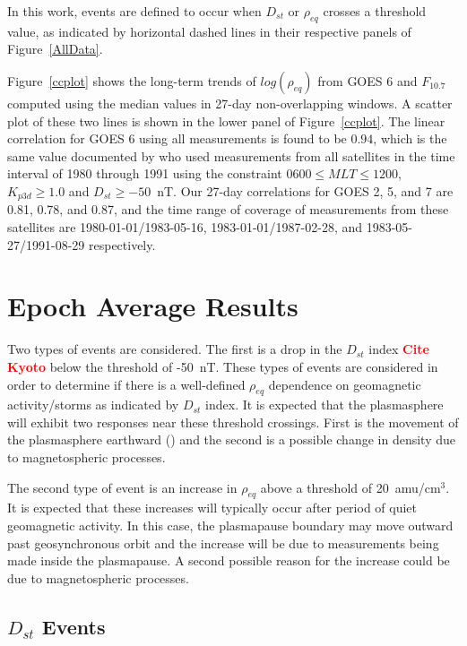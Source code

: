 \documentclass[10pt,twocolumn]{article}
\newcommand{\vinote}[1]{\textcolor{red}{\textbf{#1}}} %
\newcommand{\inote}[1]{\textcolor{blue}{\textbf{#1}}} %
\def\note#1\par{\textcolor{blue}{\textbf{#1}}\\}
\begin{document}
In this work, events are defined to occur when $D_{st}$ or $\rho_{eq}$ crosses a threshold value, as indicated by horizontal dashed lines in their respective panels of Figure~\ref{AllData}.

Figure~\ref{ccplot} shows the long-term trends of $log(\rho_{eq})$ from GOES 6 and $F_{10.7}$ computed using the median values in 27-day non-overlapping windows.  A scatter plot of these two lines is shown in the lower panel of Figure~\ref{ccplot}.  The linear correlation for GOES 6 using all measurements is found to be $0.94$, which is the same value documented by \cite{Takahashi2010} who used measurements from all satellites in the time interval of 1980 through 1991 using the constraint $0600 \leq MLT \le 1200$, $K_{p3d}\ge1.0$ and $D_{st}\ge -50$~nT.  Our 27-day correlations for GOES 2, 5, and 7 are 0.81, 0.78, and 0.87, and the time range of coverage of measurements from these satellites are 1980-01-01/1983-05-16, 1983-01-01/1987-02-28, and 1983-05-27/1991-08-29 respectively.

\section{Epoch Average Results}

Two types of events are considered. The first is a drop in the $D_{st}$ index \vinote{Cite Kyoto} below the threshold of -50~nT. These types of events are considered in order to determine if there is a well-defined $\rho_{eq}$ dependence on geomagnetic activity/storms as indicated by $D_{st}$ index.  It is expected that the plasmasphere will exhibit two responses near these threshold crossings.  First is the movement of the plasmasphere earthward (\cite{LemaireEarthsPlasmasphere}) and the second is a possible change in density due to magnetospheric processes. 

The second type of event is an increase in $\rho_{eq}$ above a threshold of 20~amu/cm$^3$.  It is expected that these increases will typically occur after period of quiet geomagnetic activity. In this case, the plasmapause boundary may move outward past geosynchronous orbit and the increase will be due to measurements being made inside the plasmapause.  A second possible reason for the increase could be due to magnetospheric processes.

\subsection{$D_{st}$ Events}
\end{document}
